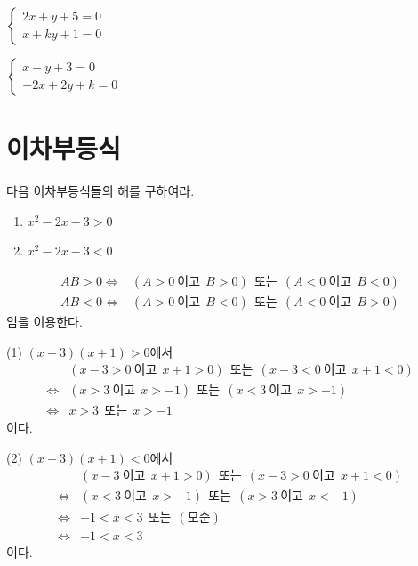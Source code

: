 \documentclass{oblivoir}
\begin{document}
%
\label{system_problem2}
\(\begin{cases}
2x+y+5=0\\
x+ky+1=0
\end{cases}\)

%
\label{system_problem3}
\(\begin{cases}
x-y+3=0\\
-2x+2y+k=0
\end{cases}\)

\section{이차부등식}

%
\exam{}\label{D>0}
다음 이차부등식들의 해를 구하여라.
\begin{enumerate}
\item
\(x^2-2x-3>0\)
\item
\(x^2-2x-3<0\)
\end{enumerate}

\begin{mdframed}[frametitle=풀이1]
\vspace{-20pt}
\begin{align*}
AB>0\iff&(A>0\:이고\:\:B>0)\:\:또는\:\:(A<0\:이고\:\:B<0)\\
AB<0\iff&(A>0\:이고\:\:B<0)\:\:또는\:\:(A<0\:이고\:\:B>0)
\end{align*}
임을 이용한다.

\bigskip\bigskip
(1) \((x-3)(x+1)>0\)에서
\begin{align*}
&(x-3>0\:이고\:\:x+1>0)\:\:또는\:\:(x-3<0\:이고\:\:x+1<0)\\
\iff
&(x>3\:이고\:\:x>-1)\:\:또는\:\:(x<3\:이고\:\:x>-1)\\
\iff
&x>3\:\:또는\:\:x>-1
\end{align*}
이다.

\bigskip\bigskip
(2) \((x-3)(x+1)<0\)에서
\begin{align*}
&(x-3\:이고\:\:x+1>0)\:\:또는\:\:(x-3>0\:이고\:\:x+1<0)\\
\iff
&(x<3\:이고\:\:x>-1)\:\:또는\:\:(x>3\:이고\:\:x<-1)\\
\iff
&-1<x<3\:\:또는\:\:(모순)\\
\iff
&-1<x<3
\end{align*}
이다.
\end{mdframed}
\end{document}
